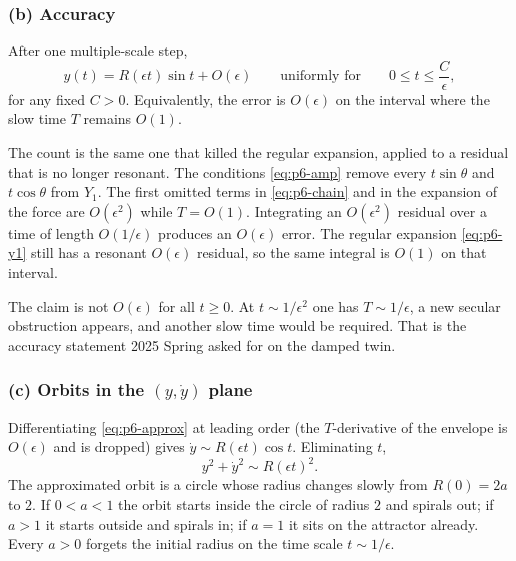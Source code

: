 \subsubsection{(b) Accuracy}

After one multiple-scale step,
\begin{equation}
\label{eq:p6-acc}
y(t)=R(\epsilon t)\sin t+O(\epsilon)
\qquad\text{uniformly for}\qquad
0\le t\le\frac{C}{\epsilon},
\end{equation}
for any fixed \(C>0\). Equivalently, the error is \(O(\epsilon)\) on the interval where the slow time \(T\) remains \(O(1)\).

The count is the same one that killed the regular expansion, applied to a residual that is no longer resonant. The conditions \eqref{eq:p6-amp} remove every \(t\sin\theta\) and \(t\cos\theta\) from \(Y_1\). The first omitted terms in \eqref{eq:p6-chain} and in the expansion of the force are \(O(\epsilon^2)\) while \(T=O(1)\). Integrating an \(O(\epsilon^2)\) residual over a time of length \(O(1/\epsilon)\) produces an \(O(\epsilon)\) error. The regular expansion \eqref{eq:p6-y1} still has a resonant \(O(\epsilon)\) residual, so the same integral is \(O(1)\) on that interval.

The claim is not \(O(\epsilon)\) for all \(t\ge 0\). At \(t\sim 1/\epsilon^2\) one has \(T\sim 1/\epsilon\), a new secular obstruction appears, and another slow time would be required. That is the accuracy statement 2025 Spring asked for on the damped twin.

\subsubsection{(c) Orbits in the \((y,\dot y)\) plane}

Differentiating \eqref{eq:p6-approx} at leading order (the \(T\)-derivative of the envelope is \(O(\epsilon)\) and is dropped) gives \(\dot y\sim R(\epsilon t)\cos t\). Eliminating \(t\),
\[
y^2+\dot y^2\sim R(\epsilon t)^2.
\]
The approximated orbit is a circle whose radius changes slowly from \(R(0)=2a\) to \(2\). If \(0<a<1\) the orbit starts inside the circle of radius \(2\) and spirals out; if \(a>1\) it starts outside and spirals in; if \(a=1\) it sits on the attractor already. Every \(a>0\) forgets the initial radius on the time scale \(t\sim 1/\epsilon\).

\begin{center}
\end{center}

